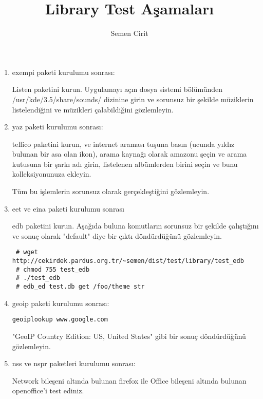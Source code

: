 \documentclass[a4paper,10pt]{article}
\title{Library Test Aşamaları}
\author{Semen Cirit}
\begin{document}
\maketitle
\begin{enumerate}
\item exempi paketi kurulumu sonrası:

Listen paketini kurun. Uygulamayı açın dosya sistemi bölümünden /usr/kde/3.5/share/sounds/ dizinine girin ve sorunsuz bir şekilde müziklerin listelendiğini ve müzikleri çalabildiğini gözlemleyin.

\item yaz paketi kurulumu sonrası:

tellico paketini kurun, ve internet araması tuşuna basın (ucunda yıldız bulunan bir asa olan ikon), arama kaynağı olarak amazonu şeçin ve arama kutusuna bir şarkı adı girin, listelenen albümlerden birini seçin ve bunu kolleksiyonunuza ekleyin. 

Tüm bu işlemlerin sorunsuz olarak gerçekleştiğini gözlemleyin.


\item eet ve eina paketi kurulumu sonrası

edb paketini kurun. Aşağıda buluna komutların sorunsuz bir şekilde çalıştığını ve sonuç olarak "default" diye bir çıktı döndürdüğünü gözlemleyin.
\begin{verbatim}
 # wget http://cekirdek.pardus.org.tr/~semen/dist/test/library/test_edb
 # chmod 755 test_edb
 # ./test_edb
 # edb_ed test.db get /foo/theme str
\end{verbatim}

\item geoip paketi kurulumu sonrası:
\begin{verbatim}
geoiplookup www.google.com 
\end{verbatim}

"GeoIP Country Edition: US, United States" gibi bir sonuç döndürdüğünü gözlemleyin.

\item nss ve nspr paketleri kurulumu sonrası:

Network bileşeni altında bulunan firefox ile Office bileşeni altında bulunan openoffice'i test ediniz.	
\end{enumerate}
\end{document}
